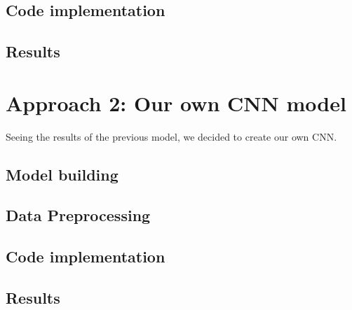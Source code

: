 \documentclass{article}
\begin{document}
    	\newpage
    	\subsection{Code implementation}
    	
    
    	\newpage
    	\subsection{Results}
    	
    	
    	   \newpage
    \section{Approach 2: Our own CNN model}
    Seeing the results of the previous model, we decided to create our own CNN.

    	    	
    	\subsection{Model building}
    	
    
    	\newpage
    	\subsection{Data Preprocessing}
    	
    	
    	\newpage
    	\subsection{Code implementation}
    	
    
    	\newpage
    	\subsection{Results}
    	
 
\end{document}
